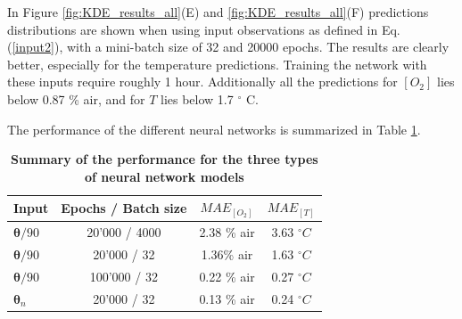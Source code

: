 \documentclass[9pt,twocolumn,twoside,pdftex]{optica}
\begin{document}

In Figure \ref{fig:KDE_results_all}(E) and \ref{fig:KDE_results_all}(F) predictions distributions are shown when using input observations as defined in Eq. (\ref{input2}), with a mini-batch size of 32 and 20000 epochs. The results are clearly better, especially for the temperature predictions. Training the network with these inputs require roughly 1 hour. Additionally all the predictions for $[O_2]$ lies below 0.87 \% air, and for $T$ lies below 1.7 $^\circ$ C. 



The performance of the different neural networks is summarized in Table \ref{TableMAE_summary}. 
\begin{table}[hbt]
\centering
\caption {\bf Summary of the performance for the three types of neural network models}

\begin{tabular}{ lccc}
\smallskip 
 Input & Epochs / Batch size & $MAE_{[O_2]}$ & $MAE_{[T]}$  \\ 
 \hline
${\pmb \theta} / 90$ & 20'000 / 4000 & 2.38 \% air & 3.63 $^\circ C$\\ 
${\pmb \theta} / 90$ & 20'000 / 32 & 1.36\% air & 1.63 $^\circ C$\\ 
${\pmb \theta} / 90$& 100'000 / 32 & 0.22 \% air & 0.27 $^\circ C$\\ 
${\pmb \theta}_n$ & 20'000 / 32 & 0.13 \% air & 0.24 $^\circ C$\\ 

\end{tabular}
\label{TableMAE_summary}
\end{table}
\end{document}
